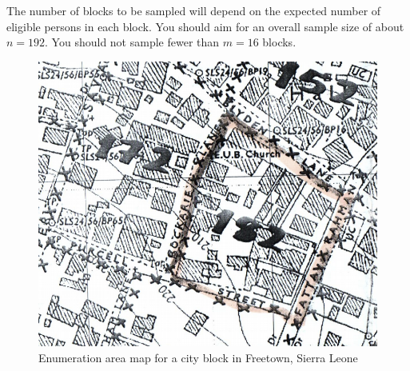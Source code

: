 \documentclass[12pt,a4paper]{book}
\theoremstyle{definition}
\theoremstyle{definition}
\theoremstyle{definition}
\theoremstyle{remark}
\begin{document}
The number of blocks to be sampled will depend on the expected number of
eligible persons in each block. You should aim for an overall sample
size of about \(n = 192\). You should not sample fewer than \(m = 16\)
blocks.

\begin{figure}[H]

{\centering \includegraphics[width=800pt]{figures/stage2sample11} 

}

\caption{Enumeration area map for a city block in Freetown, Sierra Leone}\label{fig:sample25}
\end{figure}
\end{document}
